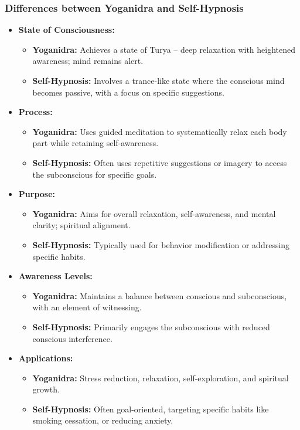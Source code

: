 \begin{frame}[fragile]\frametitle{Differences between Yoganidra and Self-Hypnosis}
    \begin{itemize}
        \item \textbf{State of Consciousness:}
            \begin{itemize}
                \item \textbf{Yoganidra:} Achieves a state of Turya – deep relaxation with heightened awareness; mind remains alert.
                \item \textbf{Self-Hypnosis:} Involves a trance-like state where the conscious mind becomes passive, with a focus on specific suggestions.
            \end{itemize}
        \item \textbf{Process:}
            \begin{itemize}
                \item \textbf{Yoganidra:} Uses guided meditation to systematically relax each body part while retaining self-awareness.
                \item \textbf{Self-Hypnosis:} Often uses repetitive suggestions or imagery to access the subconscious for specific goals.
            \end{itemize}
        \item \textbf{Purpose:}
            \begin{itemize}
                \item \textbf{Yoganidra:} Aims for overall relaxation, self-awareness, and mental clarity; spiritual alignment.
                \item \textbf{Self-Hypnosis:} Typically used for behavior modification or addressing specific habits.
            \end{itemize}
        \item \textbf{Awareness Levels:}
            \begin{itemize}
                \item \textbf{Yoganidra:} Maintains a balance between conscious and subconscious, with an element of witnessing.
                \item \textbf{Self-Hypnosis:} Primarily engages the subconscious with reduced conscious interference.
            \end{itemize}
        \item \textbf{Applications:}
            \begin{itemize}
                \item \textbf{Yoganidra:} Stress reduction, relaxation, self-exploration, and spiritual growth.
                \item \textbf{Self-Hypnosis:} Often goal-oriented, targeting specific habits like smoking cessation, or reducing anxiety.
            \end{itemize}
    \end{itemize}
\end{frame}


